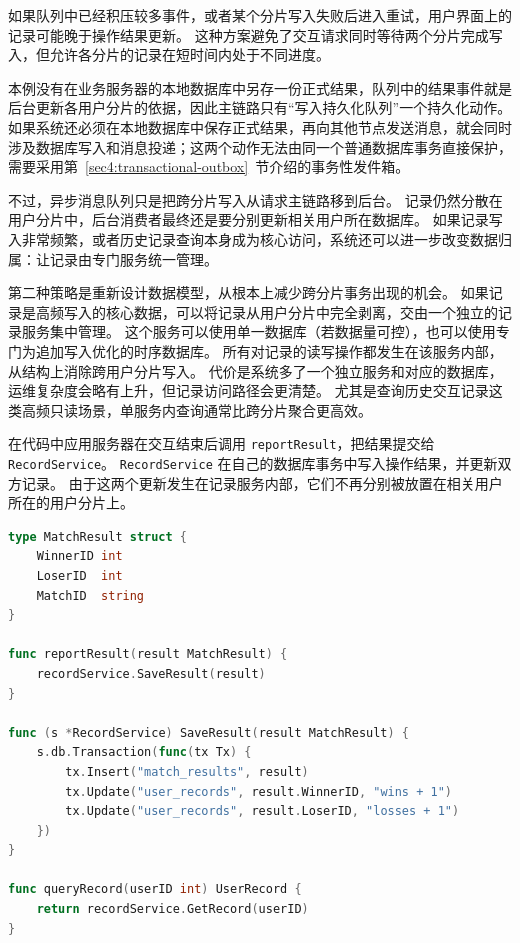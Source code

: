 如果队列中已经积压较多事件，或者某个分片写入失败后进入重试，用户界面上的记录可能晚于操作结果更新。
这种方案避免了交互请求同时等待两个分片完成写入，但允许各分片的记录在短时间内处于不同进度。

本例没有在业务服务器的本地数据库中另存一份正式结果，队列中的结果事件就是后台更新各用户分片的依据，因此主链路只有“写入持久化队列”一个持久化动作。
如果系统还必须在本地数据库中保存正式结果，再向其他节点发送消息，就会同时涉及数据库写入和消息投递；这两个动作无法由同一个普通数据库事务直接保护，需要采用第~\ref{sec4:transactional-outbox}~节介绍的事务性发件箱。

不过，异步消息队列只是把跨分片写入从请求主链路移到后台。
记录仍然分散在用户分片中，后台消费者最终还是要分别更新相关用户所在数据库。
如果记录写入非常频繁，或者历史记录查询本身成为核心访问，系统还可以进一步改变数据归属：让记录由专门服务统一管理。

第二种策略是重新设计数据模型，从根本上减少跨分片事务出现的机会。
如果记录是高频写入的核心数据，可以将记录从用户分片中完全剥离，交由一个独立的记录服务集中管理。
这个服务可以使用单一数据库（若数据量可控），也可以使用专门为追加写入优化的时序数据库。
所有对记录的读写操作都发生在该服务内部，从结构上消除跨用户分片写入。
代价是系统多了一个独立服务和对应的数据库，运维复杂度会略有上升，但记录访问路径会更清楚。
尤其是查询历史交互记录这类高频只读场景，单服务内查询通常比跨分片聚合更高效。

在代码中应用服务器在交互结束后调用 \texttt{reportResult}，把结果提交给 \texttt{RecordService}。
\texttt{RecordService} 在自己的数据库事务中写入操作结果，并更新双方记录。
由于这两个更新发生在记录服务内部，它们不再分别被放置在相关用户所在的用户分片上。

\begin{tcolorbox}[title=独立记录服务的核心逻辑]
\begin{lstlisting}[style=codeblock, language=go]
type MatchResult struct {
    WinnerID int
    LoserID  int
    MatchID  string
}

func reportResult(result MatchResult) {
    recordService.SaveResult(result)
}

func (s *RecordService) SaveResult(result MatchResult) {
    s.db.Transaction(func(tx Tx) {
        tx.Insert("match_results", result)
        tx.Update("user_records", result.WinnerID, "wins + 1")
        tx.Update("user_records", result.LoserID, "losses + 1")
    })
}

func queryRecord(userID int) UserRecord {
    return recordService.GetRecord(userID)
}
\end{lstlisting}
\end{tcolorbox}


